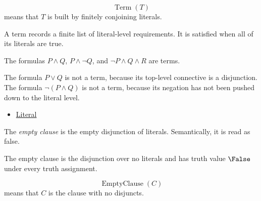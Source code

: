 \begin{remark*}
\[
\operatorname{Term}(T)
\]
means that \(T\) is built by finitely conjoining literals.
\end{remark*}

\begin{remark*}[Interpretation]
A term records a finite list of literal-level requirements. It is satisfied
when all of its literals are true.
\end{remark*}

\begin{remark*}[Examples]
The formulas \(P\land Q\), \(P\land\neg Q\), and
\(\neg P\land Q\land R\) are terms.
\end{remark*}

\begin{remark*}
The formula \(P\lor Q\) is not a term, because its top-level connective is a
disjunction. The formula \(\neg(P\land Q)\) is not a term, because its negation
has not been pushed down to the literal level.
\end{remark*}

\begin{dependencies}
\begin{itemize}
  \item \hyperref[def:literal-propositional-logic]{Literal}
\end{itemize}
\end{dependencies}

\begin{tcolorbox}[colback=propbox, colframe=propborder, arc=2pt,
  left=6pt, right=6pt, top=4pt, bottom=4pt,
  title={\small\textbf{Definition (Empty Clause)}},
  fonttitle=\small\bfseries]
\begin{definition}
\label{def:empty-clause-propositional-logic}
The \emph{empty clause} is the empty disjunction of literals. Semantically, it
is read as false.
\end{definition}
\end{tcolorbox}

\begin{remark*}
The empty clause is the disjunction over no literals and has truth value
\(\False\) under every truth assignment.
\end{remark*}

\begin{remark*}
\[
\operatorname{EmptyClause}(C)
\]
means that \(C\) is the clause with no disjuncts.
\end{remark*}

